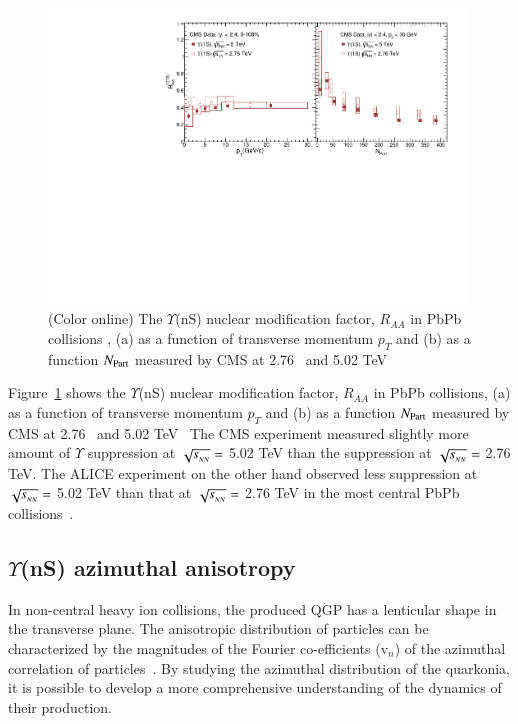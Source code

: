 \begin{figure}
  \includegraphics[width=0.99\textwidth]{Figures/ExpOverview/Fig_CMS_Y1SRAAPtNPart_En.pdf}
  \caption{(Color online) The $\Upsilon$(nS) nuclear modification factor, $R_{AA}$ in PbPb collisions ,
    (a) as a function of transverse momentum $p_{T}$
    and (b) as a function $N_{\rm Part}$ measured by CMS 
    at 2.76~\cite{Khachatryan:2016xxp} and 5.02 TeV~\cite{CMS:2018zza}
  }
  \label{fig:LHCYnSRAAenergy}
\end{figure}




Figure~\ref{fig:LHCYnSRAAenergy} shows 
the $\Upsilon$(nS) nuclear modification factor, $R_{AA}$ in PbPb collisions,
(a) as a function of transverse momentum $p_{T}$
  and (b) as a function $N_{\rm Part}$ measured by CMS
    at 2.76~\cite{Khachatryan:2016xxp} and 5.02 TeV~\cite{CMS:2018zza}
 The CMS experiment measured slightly more amount of $\Upsilon$ suppression at
 $\sqrt{s_{_{NN}}} =$ 5.02 TeV than the suppression at $\sqrt{s_{_{NN}}} =$ 2.76 TeV.
 The ALICE experiment on the other hand observed less
suppression at $\sqrt{s_{_{NN}}} =$ 5.02 TeV than that at $\sqrt{s_{_{NN}}} =$ 2.76 TeV 
in the most central PbPb collisions~\cite{Abelev:2014nua,ALICE:2018wzm}. 
  


    
    
\subsection{$\Upsilon$(nS) azimuthal anisotropy}


In non-central heavy ion collisions,
the produced QGP has a lenticular shape in the transverse plane.
The anisotropic
distribution of particles can be characterized by the magnitudes
of the Fourier co-efficients (v$_{n}$) of the azimuthal correlation of
particles~\cite{Voloshin:1994mz}. By studying the azimuthal distribution of
the quarkonia, it is possible to develop a more comprehensive understanding
of the dynamics of their production.

